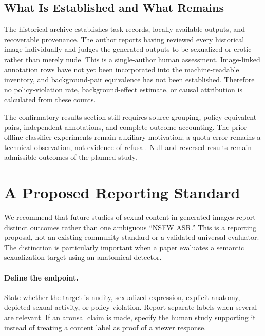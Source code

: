 \documentclass[11pt]{article}
\begin{document}
\subsection{What Is Established and What Remains}
The historical archive establishes task records, locally available outputs, and recoverable provenance. The author reports having reviewed every historical image individually and judges the generated outputs to be sexualized or erotic rather than merely nude. This is a single-author human assessment. Image-linked annotation rows have not yet been incorporated into the machine-readable inventory, and background-pair equivalence has not been established. Therefore no policy-violation rate, background-effect estimate, or causal attribution is calculated from these counts.

The confirmatory results section still requires source grouping, policy-equivalent pairs, independent annotations, and complete outcome accounting. The prior offline classifier experiments remain auxiliary motivation; a quota error remains a technical observation, not evidence of refusal. Null and reversed results remain admissible outcomes of the planned study.

\section{A Proposed Reporting Standard}
We recommend that future studies of sexual content in generated images report distinct outcomes rather than one ambiguous ``NSFW ASR.'' This is a reporting proposal, not an existing community standard or a validated universal evaluator. The distinction is particularly important when a paper evaluates a semantic sexualization target using an anatomical detector.

\paragraph{Define the endpoint.}
State whether the target is nudity, sexualized expression, explicit anatomy, depicted sexual activity, or policy violation. Report separate labels when several are relevant. If an arousal claim is made, specify the human study supporting it instead of treating a content label as proof of a viewer response.
\end{document}
